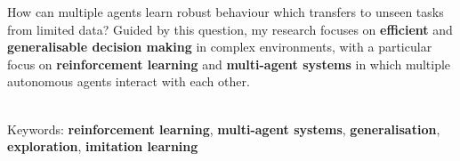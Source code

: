 \documentclass[]{lukas-cv-openfont}
\begin{document}


\vspace{1em}

\noindent
\vspace{-1em}
\begin{flushleft}
    How can multiple agents learn robust behaviour which transfers to unseen tasks from limited data? Guided by this question, my research focuses on \textbf{efficient} and \textbf{generalisable decision making} in complex environments, with a particular focus on \textbf{reinforcement learning} and \textbf{multi-agent systems} in which multiple autonomous agents interact with each other.


    \ \\

    Keywords: \textbf{reinforcement learning}, \textbf{multi-agent systems}, \textbf{generalisation}, \textbf{exploration}, \textbf{imitation learning}%
\end{flushleft}
\largesectionsep
\end{document}
